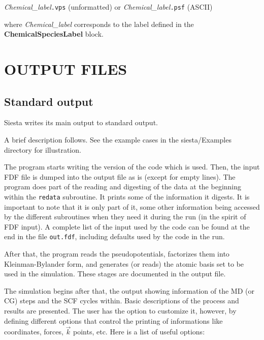 \documentclass[11pt]{article}
\begin{document}
{\it Chemical\_label}{\tt .vps} (unformatted) or
{\it Chemical\_label}{\tt .psf} (ASCII)

\noindent 
where {\it Chemical\_label} corresponds to the label defined in the
{\bf ChemicalSpeciesLabel} block.
        
\section{OUTPUT FILES}

\subsection{Standard output} 

{\sc Siesta} writes its main output to standard output. 

A brief description follows. See the example cases in the 
siesta/Examples directory for illustration. 

The program starts writing the version of
the code which is used. Then, the input FDF file is dumped into
the output file as is (except for empty lines). The program does
part of the reading and digesting of the data at the beginning
within the {\tt redata} subroutine. It prints some of the information
it digests. It is important to note that it is only part of it,
some other information being accessed by the different subroutines
when they need it during the run (in the spirit of FDF input).
A complete list of the input used by the code can be found at the
end in the file {\tt out.fdf}, including defaults used by the code
in the run.

After that, the program reads the pseudopotentials, factorizes them
into Kleinman-Bylander form, and generates (or reads) the atomic basis
set to be used in the simulation. These stages are documented in the
output file.

The simulation begins after that, the output showing information of
the MD (or CG) steps and the SCF cycles within.  Basic descriptions of
the process and results are presented. The user has the option to
customize it, however, by defining
different options that control the printing of informations like
coordinates, forces, $\vec k$ points, etc.  Here is a list of useful
options:
 
\end{document}
